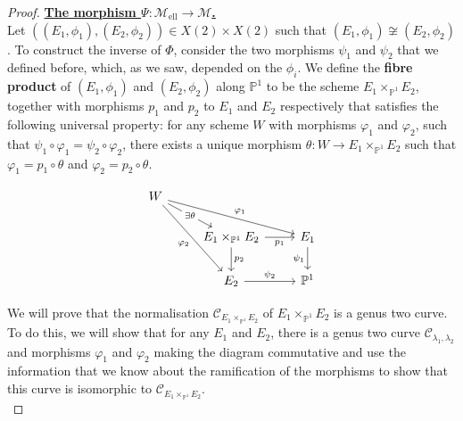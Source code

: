 \documentclass[10pt,a4paper]{amsart}
\newcommand{\calC}{\mathcal{C}}
\newcommand{\calM}{\mathcal{M}}
\newcommand{\mell}{\mathcal{M}_{\text{ell}}}
\newcommand{\nor}{\calC_{E_1 \times_{\mathbb{P}^1} E_2}}
\begin{document}
\begin{proof}
\underline{\textbf{The morphism $\Psi:\mell\rightarrow\calM$.}}\\

Let $((E_1,\phi_1),(E_2,\phi_2))\in X(2)\times X(2)$ such that $(E_1,\phi_1)\not\cong(E_2,\phi_2)$. To construct the inverse of $\Phi$, consider the two morphisms $\psi_1$ and $\psi_2$ that we defined before, which, as we saw, depended on the $\phi_i$.  We define the \textbf{fibre product} of $(E_1,\phi_1)$ and $(E_2,\phi_2)$ along $\mathbb{P}^1$ to be the scheme $E_1\times_{\mathbb{P}^1}E_2$, together with morphisms $p_1$ and $p_2$ to $E_1$ and $E_2$ respectively that satisfies the following universal property: for any scheme $W$
with morphisms $\varphi_1$ and $\varphi_2$, such that $\psi_1\circ\varphi_1=\psi_2\circ\varphi_2$, there exists a unique morphism $\theta:W\rightarrow E_1\times_{\mathbb{P}^1}E_2$ such that $\varphi_1=p_1\circ\theta$ and $\varphi_2=p_2\circ\theta$.

\[\begin{tikzcd}
W \arrow[rd, "\exists\theta" description] \arrow[rrd, "\varphi_1"] \arrow[rdd, "\varphi_2"'] &                                                                &                          \\
                                                                                      & E_1\times_{\mathbb{P}^1}E_2 \arrow[r, "p_1"'] \arrow[d, "p_2"] & E_1 \arrow[d, "\psi_1"'] \\
                                                                                      & E_2 \arrow[r, "\psi_2"]                                        & \mathbb{P}^1            
\end{tikzcd}\vspace{10pt}\]

We will prove that the normalisation $\nor$ of $E_1\times_{\mathbb{P}^1}E_2$ is a genus two curve. To do this, we will show that for any $E_1$ and $E_2$, there is a genus two curve $\calC_{\lambda_1,\lambda_2}$ and morphisms $\varphi_1$ and $\varphi_2$ making the diagram commutative and use the information that we know about the ramification of the morphisms to show that this curve is isomorphic to $\nor$.\\


\end{proof}
\end{document}
